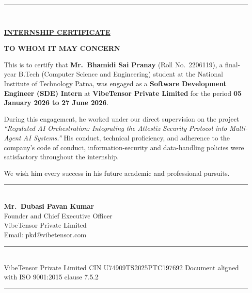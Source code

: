 \vspace{0.04in}
\noindent\rule{\linewidth}{0.3pt}\\[0.04in]

\begin{center}
{\normalsize \textbf{\underline{INTERNSHIP CERTIFICATE}}}
\end{center}

\vspace{0.04in}


\vspace{0.18in}

\begin{center}\textbf{TO WHOM IT MAY CONCERN}\end{center}

\vspace{0.12in}

{\small

\noindent
This is to certify that \textbf{Mr.\ Bhamidi Sai Pranay} (Roll No.\ 2206119), a final-year B.Tech (Computer Science and Engineering) student at the National Institute of Technology Patna, was engaged as a \textbf{Software Development Engineer (SDE) Intern} at \textbf{VibeTensor Private Limited} for the period \textbf{05 January 2026 to 27 June 2026}.

\vspace{0.1in}

\noindent
During this engagement, he worked under our direct supervision on the project \textit{``Regulated AI Orchestration: Integrating the Attestix Security Protocol into Multi-Agent AI Systems.''} His conduct, technical proficiency, and adherence to the company's code of conduct, information-security and data-handling policies were satisfactory throughout the internship.

\vspace{0.1in}

\noindent
We wish him every success in his future academic and professional pursuits.

}

\vspace{0.35in}

\begin{flushleft}
\rule{5.5cm}{0.4pt}\\[0.04in]
\textbf{Mr.\ Dubasi Pavan Kumar}\\
{\small Founder and Chief Executive Officer\\
VibeTensor Private Limited\\
Email: pkd@vibetensor.com}
\end{flushleft}

\vfill
\noindent\rule{\linewidth}{0.3pt}\\
{\scriptsize VibeTensor Private Limited \quad CIN U74909TS2025PTC197692 \quad Document aligned with ISO 9001:2015 clause 7.5.2}\\
\noindent\rule{\linewidth}{1.2pt}
